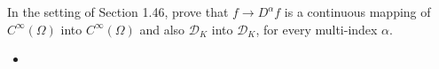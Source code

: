 In the setting of Section 1.46, prove that $f\to D^\alpha f$ is a continuous mapping of $C^{\infty}(\Omega)$ into $C^\infty(\Omega)$ and also $\mathcal{D}_K$ into $\mathcal{D}_K$, for every multi-index $\alpha$.
\begin{itemize}
    \item 
\end{itemize}